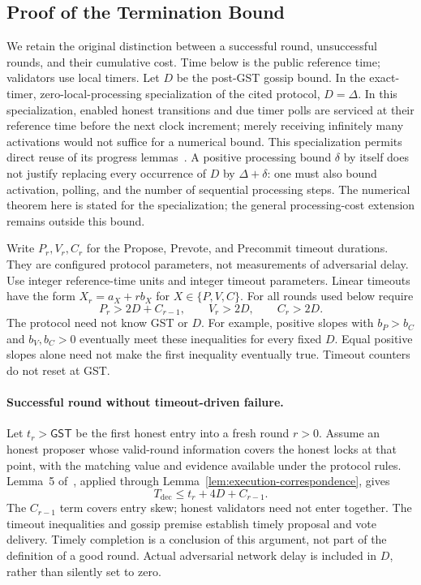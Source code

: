 \documentclass[conference,letterpaper,10pt]{IEEEtran}
\begin{document}
\subsection{Proof of the Termination Bound}

We retain the original distinction between a successful round, unsuccessful rounds, and their cumulative cost. Time below is the public reference time; validators use local timers. Let $D$ be the post-GST gossip bound. In the exact-timer, zero-local-processing specialization of the cited protocol, $D=\Delta$. In this specialization, enabled honest transitions and due timer polls are serviced at their reference time before the next clock increment; merely receiving infinitely many activations would not suffice for a numerical bound. This specialization permits direct reuse of its progress lemmas~\cite{buchman2018latest}. A positive processing bound $\delta$ by itself does not justify replacing every occurrence of $D$ by $\Delta+\delta$: one must also bound activation, polling, and the number of sequential processing steps. The numerical theorem here is stated for the specialization; the general processing-cost extension remains outside this bound.

Write $P_r,V_r,C_r$ for the Propose, Prevote, and Precommit timeout durations. They are configured protocol parameters, not measurements of adversarial delay. Use integer reference-time units and integer timeout parameters. Linear timeouts have the form $X_r=a_X+r b_X$ for $X\in\{P,V,C\}$. For all rounds used below require
\[
 P_r>2D+C_{r-1},\qquad V_r>2D,\qquad C_r>2D.
\]
The protocol need not know GST or $D$. For example, positive slopes with $b_P>b_C$ and $b_V,b_C>0$ eventually meet these inequalities for every fixed $D$. Equal positive slopes alone need not make the first inequality eventually true. Timeout counters do not reset at GST.

\paragraph{Successful round without timeout-driven failure.}
Let $t_r>\mathsf{GST}$ be the first honest entry into a fresh round $r>0$. Assume an honest proposer whose valid-round information covers the honest locks at that point, with the matching value and evidence available under the protocol rules. Lemma~5 of~\cite{buchman2018latest}, applied through Lemma~\ref{lem:execution-correspondence}, gives
\[
 T_{\mathrm{dec}}\leq t_r+4D+C_{r-1}.
\]
The $C_{r-1}$ term covers entry skew; honest validators need not enter together. The timeout inequalities and gossip premise establish timely proposal and vote delivery. Timely completion is a conclusion of this argument, not part of the definition of a good round. Actual adversarial network delay is included in $D$, rather than silently set to zero.
\end{document}
